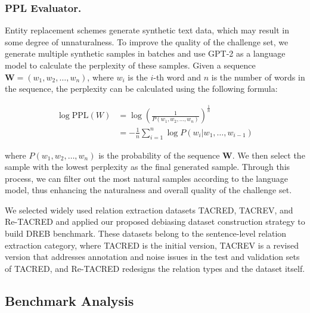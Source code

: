 \documentclass[letterpaper]{article} %
\begin{document}
\subsubsection{PPL Evaluator.}
Entity replacement schemes generate synthetic text data, which may result in some degree of unnaturalness. To improve the quality of the challenge set, we generate multiple synthetic samples in batches and use GPT-2 \cite{radford2019language} as a language model to calculate the perplexity of these samples. Given a sequence \( \mathbf{W} = (w_1, w_2, \ldots, w_n) \), where \( w_i \) is the \( i \)-th word and \( n \) is the number of words in the sequence, the perplexity can be calculated using the following formula:

\begin{equation}
    \begin{aligned}
        \log \text{PPL}(W) &= \log \left( \frac{1}{P(w_1, w_2, \ldots, w_n)} \right)^{\frac{1}{n}} \\
        &= -\frac{1}{n} \sum_{i=1}^{n} \log P(w_i|w_1, \ldots, w_{i-1})
    \end{aligned}
\end{equation}

\noindent where \( P(w_1, w_2, \ldots, w_n) \) is the probability of the sequence \( \mathbf{W} \). We then select the sample with the lowest perplexity as the final generated sample. Through this process, we can filter out the most natural samples according to the language model, thus enhancing the naturalness and overall quality of the challenge set.

We selected widely used relation extraction datasets TACRED, TACREV, and Re-TACRED and applied our proposed debiasing dataset construction strategy to build DREB benchmark. These datasets belong to the sentence-level relation extraction category, where TACRED is the initial version, TACREV is a revised version that addresses annotation and noise issues in the test and validation sets of TACRED, and Re-TACRED redesigns the relation types and the dataset itself.

\subsection{Benchmark Analysis}
\end{document}
